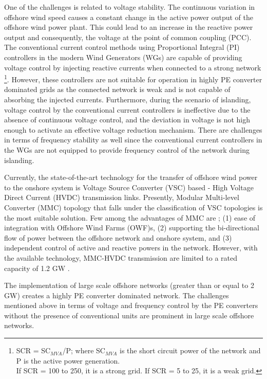 One of the challenges is related to voltage stability. The continuous variation in offshore wind speed causes a constant change in the active power output of the offshore wind power plant. This could lead to an increase in the reactive power output and consequently, the voltage at the point of common coupling (\gls{PCC}). The conventional current control methods using Proportional Integral (\gls{PI}) controllers in the modern Wind Generators (\gls{WG}s) are capable of providing voltage control by injecting reactive currents when connected to a strong network \footnote{SCR = SC$_{MVA}$/P;\; where SC$_{MVA}$ is the short circuit power of the network and P is the active power generation. \\
If SCR = 100 to 250, it is a strong grid. If SCR = 5 to 25, it is a weak grid.}. However, these controllers are not suitable for operation in highly \gls{PE} converter dominated grids as the connected network is weak and is not capable of absorbing the injected currents. Furthermore, during the scenario of islanding, voltage control by the conventional current controllers is ineffective due to the absence of continuous voltage control, and the deviation in voltage is not high enough to activate an effective voltage reduction mechanism. There are challenges in terms of frequency stability as well since the conventional current controllers in the \gls{WG}s are not equipped to provide frequency control of the network during islanding. 

Currently, the state-of-the-art technology for the transfer of offshore wind power to the onshore system is Voltage Source Converter (\gls{VSC}) based  - High Voltage Direct Current (\gls{HVDC}) transmission links. Presently, Modular Multi-level Converter (\gls{MMC}) topology that falls under the classification of \gls{VSC} topologies is the most suitable solution. Few among the advantages of \gls{MMC} are \cite{cigre_B455}; (1) ease of integration with Offshore Wind Farms (\gls{OWF})s, (2) supporting the bi-directional flow of power between the offshore network and onshore system, and (3) independent control of active and reactive powers in the network. However, with the available technology, \gls{MMC}-\gls{HVDC} transmission are limited to a rated capacity of 1.2 GW \cite{peralta2012detailed}.

The implementation of large scale offshore networks (greater than or equal to 2 GW) creates a highly \gls{PE} converter dominated network. The challenges mentioned above in terms of voltage and frequency control by the \gls{PE} converters without the presence of conventional units are prominent in large scale offshore networks. 

